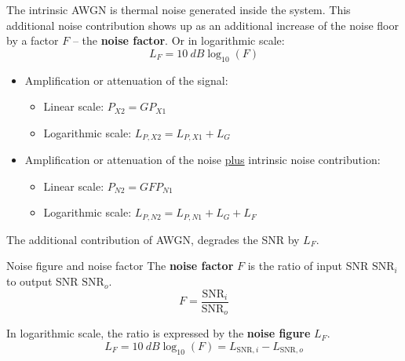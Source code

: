 \begin{refsection}
The intrinsic \ac{AWGN} is thermal noise generated inside the system. This additional noise contribution shows up as an additional increase of the noise floor by a factor $F$ -- the  \textbf{noise factor}. Or in logarithmic scale:
\begin{equation}
	L_F = \SI{10}{dB} \log_{10} \left(F\right)
\end{equation}

\begin{itemize}
	\item Amplification or attenuation of the signal:
	\begin{itemize}
		\item Linear scale: $P_{X2} = G P_{X1}$
		\item Logarithmic scale: $L_{P,X2} = L_{P,X1} + L_G$
	\end{itemize}
	\item Amplification or attenuation of the noise \underline{plus} intrinsic noise contribution:
	\begin{itemize}
		\item Linear scale: $P_{N2} = G F P_{N1}$
		\item Logarithmic scale: $L_{P,N2} = L_{P,N1} + L_G + L_F$
	\end{itemize}
\end{itemize}

The additional contribution of \ac{AWGN}, degrades the \ac{SNR} by $L_F$.

\begin{definition}{Noise figure and noise factor}
	The  \textbf{noise factor} $F$ is the ratio of input \ac{SNR} $\mathrm{SNR}_i$ to output \ac{SNR} $\mathrm{SNR}_o$.
	\begin{equation}
		F = \frac{\mathrm{SNR}_i}{\mathrm{SNR}_o}
	\end{equation}
	
	In logarithmic scale, the ratio is expressed by the  \textbf{noise figure} $L_F$.
	\begin{equation}
		L_F = \SI{10}{dB} \log_{10} \left(F\right) = L_{\mathrm{SNR},i} - L_{\mathrm{SNR},o}
	\end{equation}
\end{definition}

\begin{figure}[H]
	\centering
\end{figure}
\end{refsection}
